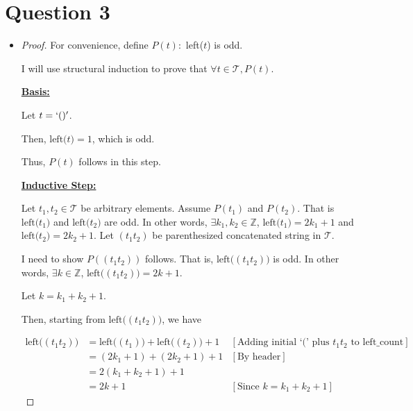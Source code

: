 \documentclass[12pt]{article}
\begin{document}
\bigskip

\section*{Question 3}

\bigskip

\begin{itemize}
    \item

    \begin{proof}
    \setcounter{equation}{0}

    For convenience, define $P(t):$ left($t$) is odd.

    \bigskip

    I will use structural induction to prove that $\forall t \in \mathcal{T}, P(t)$.

    \bigskip

    \underline{\textbf{Basis:}}

    \bigskip

    Let $t = `()'$.

    \bigskip

    Then, $\text{left($t$)} = 1$, which is odd.

    \bigskip

    Thus, $P(t)$ follows in this step.

    \bigskip

    \underline{\textbf{Inductive Step:}}

    \bigskip

    Let $t_1, t_2 \in \mathcal{T}$ be arbitrary elements. Assume $P(t_1)$ and $P(t_2)$.
    That is $\text{left($t_1$)}$ and $\text{left($t_2$)}$ are odd. In other words,
    $\exists k_1,k_2 \in \mathbb{Z}$, $\text{left($t_1$)} = 2k_1 + 1$ and
    $\text{left($t_2$)} = 2k_2 + 1$. Let $(t_1t_2)$ be parenthesized concatenated
    string in $\mathcal{T}$.

    \bigskip

    I need to show $P((t_1t_2))$ follows. That is, $\text{left($(t_1t_2)$)}$ is odd.
    In other words, $\exists k \in \mathbb{Z}$, $\text{left($(t_1t_2)$)} = 2k + 1$.

    \bigskip

    Let $k = k_1 + k_2 + 1$.

    \bigskip

    Then, starting from $\text{left($(t_1t_2)$)}$, we have

    \begin{align}
        \text{left($(t_1t_2)$)} &= \text{left($(t_1)$)} + \text{left($(t_2)$)} + 1 & [\text{Adding initial `(' plus $t_1t_2$ to left\_count}]\\
        &=  (2k_1 + 1) + (2k_2 + 1) + 1 & [\text{By header}]\\
        &=  2(k_1 + k_2 + 1) + 1\\
        &= 2k + 1 & [\text{Since $k = k_1 + k_2 + 1$}]
    \end{align}


\end{proof}
\end{itemize}
\end{document}
